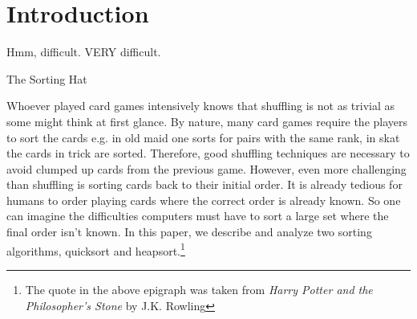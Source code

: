 \section{Introduction}
\vspace{2cm}
\epigraph{Hmm, difficult. VERY difficult.}{The Sorting Hat}
Whoever played card games intensively knows that shuffling is not as trivial as some might think at first glance. By nature, many card games require the players to sort the cards e.g. in old maid one sorts for pairs with the same rank, in skat the cards in trick are sorted. Therefore, good shuffling techniques are necessary to avoid clumped up cards from the previous game. However, even more challenging than shuffling is sorting cards back to their initial order. It is already tedious for humans to order playing cards where the correct order is already known. So one can imagine the difficulties computers must have to sort a large set where the final order isn't known. In this paper, we describe and analyze two sorting algorithms, quicksort and heapsort.\footnote{The quote in the above epigraph was taken from \textit{Harry Potter and the Philosopher's Stone} by J.K. Rowling}